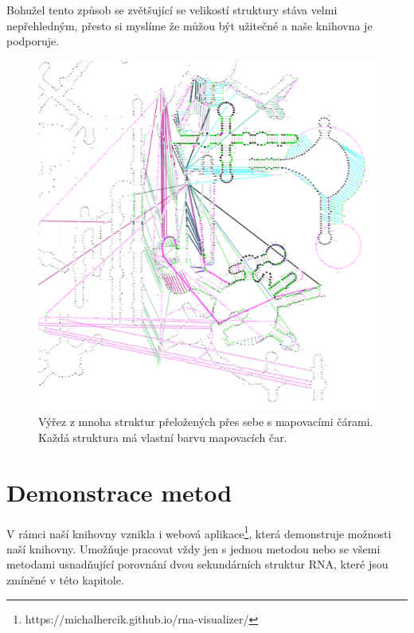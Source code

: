 Bohužel tento způsob se zvětšující se velikostí struktury stáva velmi
nepřehledným, přesto si myslíme že můžou být užitečné a naše knihovna je
podporuje.

\begin{figure}[H]
  \centering
  \includegraphics[width=140mm]{../img/kap02/mappingLines/big.png}
  \caption{Výřez z mnoha struktur přeložených přes sebe s mapovacími čárami.
  Každá struktura má vlastní barvu mapovacích čar.}
\end{figure}

\section{Demonstrace metod}

V rámci naší knihovny vznikla i webová
aplikace\footnote{https://michalhercik.github.io/rna-visualizer/}, která
demonstruje možnosti naší knihovny. Umožňuje pracovat vždy jen s jednou metodou
nebo se všemi metodami usnadňující porovnání dvou sekundárních struktur RNA,
které jsou zmíněné v této kapitole.
